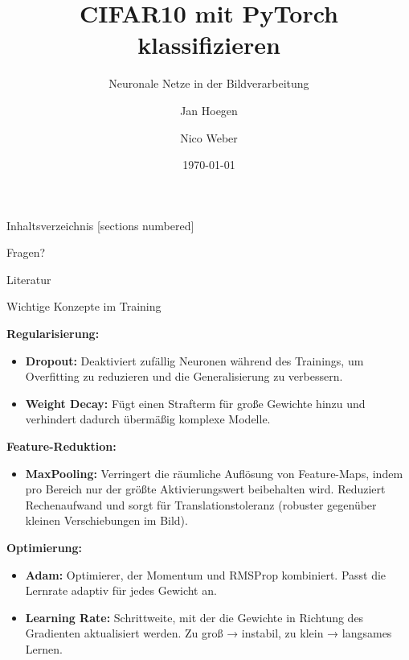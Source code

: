 \documentclass[
  fontsize=10pt, 
  aspectratio=169,
  xcolor={dvipsnames}
]{beamer}
\title{CIFAR10 mit PyTorch klassifizieren}
\subtitle{Neuronale Netze in der Bildverarbeitung}
\date{\today}
\author{Jan Hoegen \and Nico Weber}
\institute{
  Hochschule Karlsruhe\\
  University of Applied Sciences
}
\begin{document}
  \maketitle

  \begin{frame}{Inhaltsverzeichnis}
    [sections numbered]
    \tableofcontents[hideallsubsections]
  \end{frame}

  

  

  

  

  

\begin{frame}[label=conclusion, standout]
  Fragen?
\end{frame}

\appendix

\begin{frame}{Literatur}
  \nocite{*}
  \printbibliography[heading=none]
\end{frame}

\begin{frame}[allowframebreaks]{Wichtige Konzepte im Training}


\textbf{Regularisierung:}
\begin{itemize}
    \item \textbf{Dropout:} Deaktiviert zufällig Neuronen während des Trainings, um Overfitting zu reduzieren und die Generalisierung zu verbessern.
    \item \textbf{Weight Decay:} Fügt einen Strafterm für große Gewichte hinzu und verhindert dadurch übermäßig komplexe Modelle.
\end{itemize}

\textbf{Feature-Reduktion:}
\begin{itemize}
    \item \textbf{MaxPooling:} Verringert die räumliche Auflösung von Feature-Maps, indem pro Bereich nur der größte Aktivierungswert beibehalten wird.  
    Reduziert Rechenaufwand und sorgt für Translationstoleranz (robuster gegenüber kleinen Verschiebungen im Bild).
\end{itemize}

\textbf{Optimierung:}
\begin{itemize}
    \item \textbf{Adam:} Optimierer, der Momentum und RMSProp kombiniert. Passt die Lernrate adaptiv für jedes Gewicht an.
    \item \textbf{Learning Rate:} Schrittweite, mit der die Gewichte in Richtung des Gradienten aktualisiert werden.  
    Zu groß → instabil, zu klein → langsames Lernen.
\end{itemize}

\end{frame}
\end{document}
